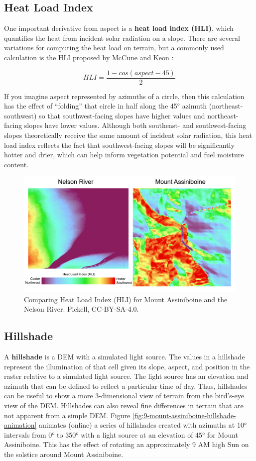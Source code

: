 \documentclass[
]{book}
\begin{document}
\subsection{Heat Load Index}\label{heat-load-index}

One important derivative from aspect is a \textbf{heat load index (HLI)}, which quantifies the heat from incident solar radiation on a slope. There are several variations for computing the heat load on terrain, but a commonly used calculation is the HLI proposed by McCune and Keon \citep{mccune_equations_2002}:

\[
HLI=\frac{1-cos(aspect-45)}{2}
\]

If you imagine aspect represented by azimuths of a circle, then this calculation has the effect of ``folding'' that circle in half along the 45° azimuth (northeast-southwest) so that southwest-facing slopes have higher values and northeast-facing slopes have lower values. Although both southeast- and southwest-facing slopes theoretically receive the same amount of incident solar radiation, this heat load index reflects the fact that southwest-facing slopes will be significantly hotter and drier, which can help inform vegetation potential and fuel moisture content.

\begin{figure}
\includegraphics[width=0.75\linewidth]{images/09-mount-assiniboine-nelson-river-heat-load-index} \caption{Comparing Heat Load Index (HLI) for Mount Assiniboine and the Nelson River. Pickell, CC-BY-SA-4.0.}\label{fig:9-mount-assiniboine-nelson-river-heat-load-index}
\end{figure}

\subsection{Hillshade}\label{hillshade}

A \textbf{hillshade} is a DEM with a simulated light source. The values in a hillshade represent the illumination of that cell given its slope, aspect, and position in the raster relative to a simulated light source. The light source has an elevation and azimuth that can be defined to reflect a particular time of day. Thus, hillshades can be useful to show a more 3-dimensional view of terrain from the bird's-eye view of the DEM. Hillshades can also reveal fine differences in terrain that are not apparent from a simple DEM. Figure \ref{fig:9-mount-assiniboine-hillshade-animation} animates (online) a series of hillshades created with azimuths at 10° intervals from 0° to 350° with a light source at an elevation of 45° for Mount Assiniboine. This has the effect of rotating an approximately 9 AM high Sun on the solstice around Mount Assiniboine.
\end{document}
